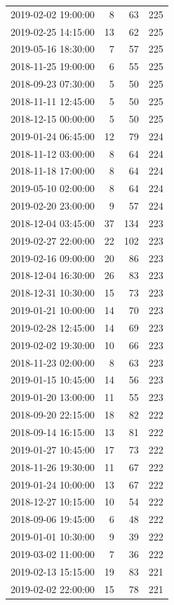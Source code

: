 \begin{tabular}{lrrr}
2019-02-02 19:00:00 & 8 & 63 & 225 \\
2019-02-25 14:15:00 & 13 & 62 & 225 \\
2019-05-16 18:30:00 & 7 & 57 & 225 \\
2018-11-25 19:00:00 & 6 & 55 & 225 \\
2018-09-23 07:30:00 & 5 & 50 & 225 \\
2018-11-11 12:45:00 & 5 & 50 & 225 \\
2018-12-15 00:00:00 & 5 & 50 & 225 \\
2019-01-24 06:45:00 & 12 & 79 & 224 \\
2018-11-12 03:00:00 & 8 & 64 & 224 \\
2018-11-18 17:00:00 & 8 & 64 & 224 \\
2019-05-10 02:00:00 & 8 & 64 & 224 \\
2019-02-20 23:00:00 & 9 & 57 & 224 \\
2018-12-04 03:45:00 & 37 & 134 & 223 \\
2019-02-27 22:00:00 & 22 & 102 & 223 \\
2019-02-16 09:00:00 & 20 & 86 & 223 \\
2018-12-04 16:30:00 & 26 & 83 & 223 \\
2018-12-31 10:30:00 & 15 & 73 & 223 \\
2019-01-21 10:00:00 & 14 & 70 & 223 \\
2019-02-28 12:45:00 & 14 & 69 & 223 \\
2019-02-02 19:30:00 & 10 & 66 & 223 \\
2018-11-23 02:00:00 & 8 & 63 & 223 \\
2019-01-15 10:45:00 & 14 & 56 & 223 \\
2019-01-20 13:00:00 & 11 & 55 & 223 \\
2018-09-20 22:15:00 & 18 & 82 & 222 \\
2018-09-14 16:15:00 & 13 & 81 & 222 \\
2019-01-27 10:45:00 & 17 & 73 & 222 \\
2018-11-26 19:30:00 & 11 & 67 & 222 \\
2019-01-24 10:00:00 & 13 & 67 & 222 \\
2018-12-27 10:15:00 & 10 & 54 & 222 \\
2018-09-06 19:45:00 & 6 & 48 & 222 \\
2019-01-01 10:30:00 & 9 & 39 & 222 \\
2019-03-02 11:00:00 & 7 & 36 & 222 \\
2019-02-13 15:15:00 & 19 & 83 & 221 \\
2019-02-02 22:00:00 & 15 & 78 & 221 \\

\end{tabular}
